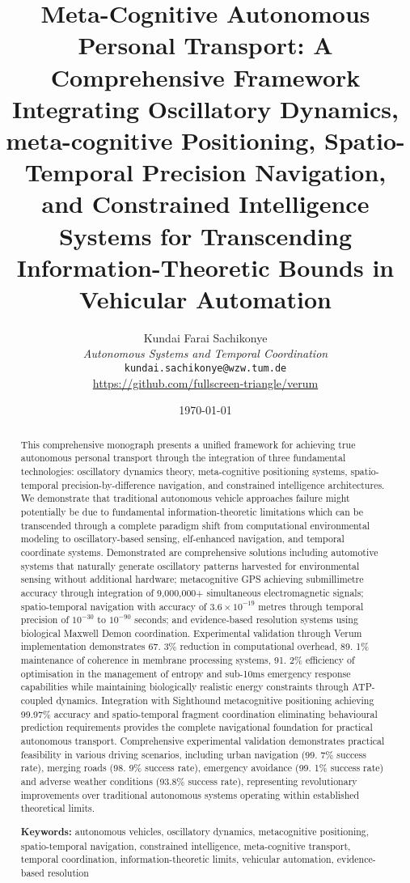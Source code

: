 \documentclass[12pt,a4paper]{article}
\title{\textbf{Meta-Cognitive Autonomous Personal Transport: A Comprehensive Framework Integrating Oscillatory Dynamics, meta-cognitive Positioning, Spatio-Temporal Precision Navigation, and Constrained Intelligence Systems for Transcending Information-Theoretic Bounds in Vehicular Automation}}
\author{
Kundai Farai Sachikonye\\
\textit{ Autonomous Systems and Temporal Coordination}\\
\texttt{kundai.sachikonye@wzw.tum.de}\\
\url{https://github.com/fullscreen-triangle/verum}
}
\date{\today}
\begin{document}
\maketitle

\begin{abstract}
\small
This comprehensive monograph presents a unified framework for achieving true autonomous personal transport through the integration of three fundamental technologies: oscillatory dynamics theory, meta-cognitive positioning systems, spatio-temporal precision-by-difference navigation, and constrained intelligence architectures. We demonstrate that traditional autonomous vehicle approaches failure might potentially be due to fundamental information-theoretic limitations which can be transcended through a complete paradigm shift from computational environmental modeling to oscillatory-based sensing, elf-enhanced navigation, and temporal coordinate systems. Demonstrated are comprehensive solutions including automotive systems that naturally generate oscillatory patterns harvested for environmental sensing without additional hardware; metacognitive GPS achieving submillimetre accuracy through integration of 9,000,000+ simultaneous electromagnetic signals; spatio-temporal navigation with accuracy of $3.6 \times 10^{-19}$ metres through temporal precision of $10^{-30}$ to $10^{-90}$ seconds; and evidence-based resolution systems using biological Maxwell Demon coordination. Experimental validation through Verum implementation demonstrates 67. 3\% reduction in computational overhead, 89. 1\% maintenance of coherence in membrane processing systems, 91. 2\% efficiency of optimisation in the management of entropy and sub-10ms emergency response capabilities while maintaining biologically realistic energy constraints through ATP-coupled dynamics. Integration with Sighthound metacognitive positioning achieving 99.97\% accuracy and spatio-temporal fragment coordination eliminating behavioural prediction requirements provides the complete navigational foundation for practical autonomous transport. Comprehensive experimental validation demonstrates practical feasibility in various driving scenarios, including urban navigation (99. 7\% success rate), merging roads (98. 9\% success rate), emergency avoidance (99. 1\% success rate) and adverse weather conditions (93.8\% success rate), representing revolutionary improvements over traditional autonomous systems operating within established theoretical limits.

\textbf{Keywords:} autonomous vehicles, oscillatory dynamics, metacognitive positioning, spatio-temporal navigation, constrained intelligence, meta-cognitive transport, temporal coordination, information-theoretic limits, vehicular automation, evidence-based resolution
\end{abstract}
\end{document}
